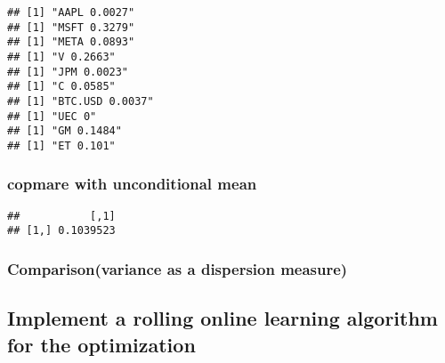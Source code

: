 \documentclass[
]{article}
\newenvironment{Shaded}{\begin{snugshade}}{\end{snugshade}}
\newcommand{\ControlFlowTok}[1]{\textcolor[rgb]{0.13,0.29,0.53}{\textbf{#1}}}
\newcommand{\DecValTok}[1]{\textcolor[rgb]{0.00,0.00,0.81}{#1}}
\newcommand{\FunctionTok}[1]{\textcolor[rgb]{0.13,0.29,0.53}{\textbf{#1}}}
\newcommand{\NormalTok}[1]{#1}
\newcommand{\SpecialCharTok}[1]{\textcolor[rgb]{0.81,0.36,0.00}{\textbf{#1}}}
\newcommand{\StringTok}[1]{\textcolor[rgb]{0.31,0.60,0.02}{#1}}
\begin{document}
\begin{Shaded}
\end{Shaded}

\begin{verbatim}
## [1] "AAPL 0.0027"
## [1] "MSFT 0.3279"
## [1] "META 0.0893"
## [1] "V 0.2663"
## [1] "JPM 0.0023"
## [1] "C 0.0585"
## [1] "BTC.USD 0.0037"
## [1] "UEC 0"
## [1] "GM 0.1484"
## [1] "ET 0.101"
\end{verbatim}

\subsubsection{copmare with unconditional
mean}\label{copmare-with-unconditional-mean}

\begin{Shaded}
\end{Shaded}

\begin{verbatim}
##           [,1]
## [1,] 0.1039523
\end{verbatim}

\subsubsection{Comparison(variance as a dispersion
measure)}\label{comparisonvariance-as-a-dispersion-measure}

\subsection{Implement a rolling online learning algorithm for the
optimization}\label{implement-a-rolling-online-learning-algorithm-for-the-optimization}
\end{document}
